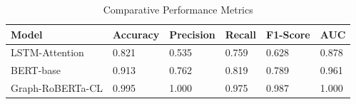 \begin{table}
\caption{Comparative Performance Metrics}
\label{tab:metrics}
\begin{tabular}{llllll}
\toprule
Model & Accuracy & Precision & Recall & F1-Score & AUC \\
\midrule
LSTM-Attention & 0.821 & 0.535 & 0.759 & 0.628 & 0.878 \\
BERT-base & 0.913 & 0.762 & 0.819 & 0.789 & 0.961 \\
Graph-RoBERTa-CL & 0.995 & 1.000 & 0.975 & 0.987 & 1.000 \\
\bottomrule
\end{tabular}
\end{table}
